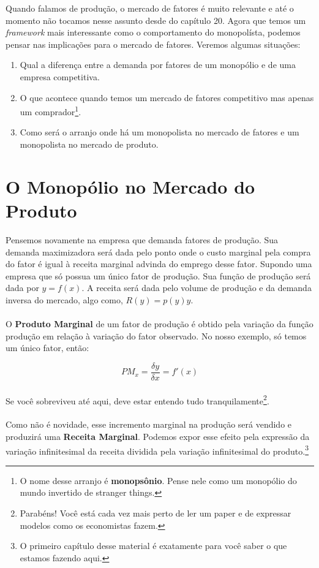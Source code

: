\documentclass[a4paper,11pt,oneside]{book}
\theoremstyle{definition}
\theoremstyle{break}
\begin{document}
Quando falamos de produção, o mercado de fatores é muito relevante e até o momento não tocamos nesse assunto desde do capítulo 20. Agora que temos um \textit{framework} mais interessante como o comportamento do monopolísta, podemos pensar nas implicações para o mercado de fatores. Veremos algumas situações: 
\begin{enumerate}

\item Qual a diferença entre a demanda por fatores de um monopólio e de uma empresa competitiva.

\item O que acontece quando temos um mercado de fatores competitivo mas apenas um comprador\footnote{O nome desse arranjo é \textbf{monopsônio}. Pense nele como um monopólio do mundo invertido de stranger things.}.

\item Como será o arranjo onde há um monopolista no mercado de fatores e um monopolista no mercado de produto.

\end{enumerate}

\section{O Monopólio no Mercado do Produto}

Pensemos novamente na empresa que demanda fatores de produção. Sua demanda maximizadora será dada pelo ponto onde o custo marginal pela compra do fator é igual à receita marginal advinda do emprego desse fator. Supondo uma empresa que só possua um único fator de produção. Sua função de produção será dada por $y = f(x)$. A receita será dada pelo volume de produção e da demanda inversa do mercado, algo como, $R(y) = p(y)y$. 
\\
\\
O \textbf{Produto Marginal} de um fator de produção é obtido pela variação da função produção em relação à variação do fator observado. No nosso exemplo, só temos um único fator, então:

$$ PM_x = \frac{\delta y}{\delta x} = f'(x) $$
\\
Se você sobreviveu até aqui, deve estar entendo tudo tranquilamente\footnote{Parabéns! Você está cada vez mais perto de ler um paper e de expressar modelos como os economistas fazem.}. 
\\
\\
Como não é novidade, esse incremento marginal na produção será vendido e produzirá uma \textbf{Receita Marginal}. Podemos expor esse efeito pela expressão da  variação infinitesimal da receita dividida pela variação infinitesimal do produto.\footnote{O primeiro capítulo desse material é exatamente para você saber o que estamos fazendo aqui.}
\end{document}
